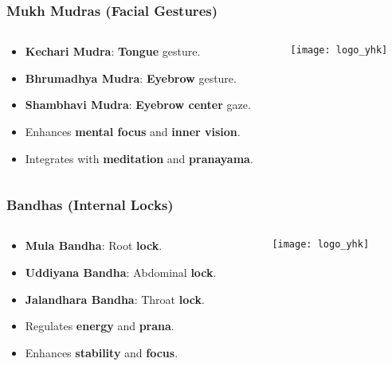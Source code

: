 \begin{frame}[fragile]\frametitle{Mukh Mudras (Facial Gestures)}
\begin{columns}
    \begin{column}[T]{0.5\linewidth}
      \begin{itemize}
        \item \textbf{Kechari Mudra}: \textbf{Tongue} gesture.
        \item \textbf{Bhrumadhya Mudra}: \textbf{Eyebrow} gesture.
        \item \textbf{Shambhavi Mudra}: \textbf{Eyebrow center} gaze.
        \item Enhances \textbf{mental focus} and \textbf{inner vision}.
        \item Integrates with \textbf{meditation} and \textbf{pranayama}.
      \end{itemize}
    \end{column}
    \begin{column}[T]{0.5\linewidth}
        \begin{center}
        \texttt{[image: logo\_yhk]}
        \end{center}	
    \end{column}
\end{columns}
\end{frame}

\begin{frame}[fragile]\frametitle{Bandhas (Internal Locks)}
\begin{columns}
    \begin{column}[T]{0.5\linewidth}
      \begin{itemize}
        \item \textbf{Mula Bandha}: Root \textbf{lock}.
        \item \textbf{Uddiyana Bandha}: Abdominal \textbf{lock}.
        \item \textbf{Jalandhara Bandha}: Throat \textbf{lock}.
        \item Regulates \textbf{energy} and \textbf{prana}.
        \item Enhances \textbf{stability} and \textbf{focus}.
      \end{itemize}
    \end{column}
    \begin{column}[T]{0.5\linewidth}
        \begin{center}
        \texttt{[image: logo\_yhk]}
        \end{center}	
    \end{column}
\end{columns}
\end{frame}

